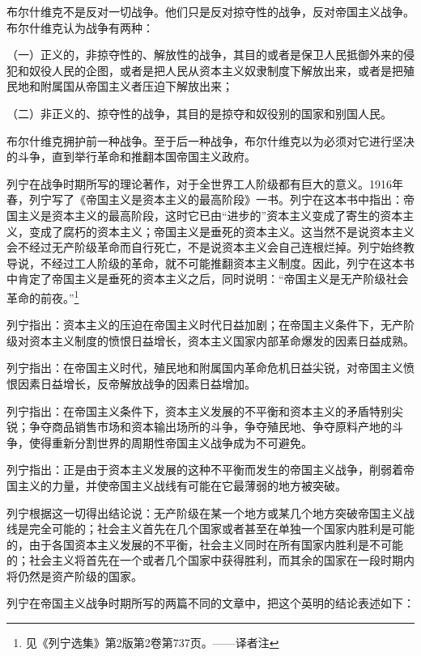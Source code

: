 布尔什维克不是反对一切战争。他们只是反对掠夺性的战争，反对帝国主义战争。布尔什维克认为战争有两种：

（一）正义的，非掠夺性的、解放性的战争，其目的或者是保卫人民抵御外来的侵犯和奴役人民的企图，或者是把人民从资本主义奴隶制度下解放出来，或者是把殖民地和附属国从帝国主义者压迫下解放出来；

（二）非正义的、掠夺性的战争，其目的是掠夺和奴役别的国家和别国人民。

布尔什维克拥护前一种战争。至于后一种战争，布尔什维克以为必须对它进行坚决的斗争，直到举行革命和推翻本国帝国主义政府。

列宁在战争时期所写的理论著作，对于全世界工人阶级都有巨大的意义。1916年春，列宁写了《帝国主义是资本主义的最高阶段》一书。列宁在这本书中指出：帝国主义是资本主义的最高阶段，这时它已由“进步的”资本主义变成了寄生的资本主义，变成了腐朽的资本主义；帝国主义是垂死的资本主义。这当然不是说资本主义会不经过无产阶级革命而自行死亡，不是说资本主义会自己连根烂掉。列宁始终教导说，不经过工人阶级的革命，就不可能推翻资本主义制度。因此，列宁在这本书中肯定了帝国主义是垂死的资本主义之后，同时说明：“帝国主义是无产阶级社会革命的前夜。”\footnote{见《列宁选集》第2版第2卷第737页。——译者注}

列宁指出：资本主义的压迫在帝国主义时代日益加剧；在帝国主义条件下，无产阶级对资本主义制度的愤恨日益增长，资本主义国家内部革命爆发的因素日益成熟。

列宁指出：在帝国主义时代，殖民地和附属国内革命危机日益尖锐，对帝国主义愤恨因素日益增长，反帝解放战争的因素日益增加。

列宁指出：在帝国主义条件下，资本主义发展的不平衡和资本主义的矛盾特别尖锐；争夺商品销售市场和资本输出场所的斗争，争夺殖民地、争夺原料产地的斗争，使得重新分割世界的周期性帝国主义战争成为不可避免。

列宁指出：正是由于资本主义发展的这种不平衡而发生的帝国主义战争，削弱着帝国主义的力量，并使帝国主义战线有可能在它最薄弱的地方被突破。

列宁根据这一切得出结论说：无产阶级在某一个地方或某几个地方突破帝国主义战线是完全可能的；社会主义首先在几个国家或者甚至在单独一个国家内胜利是可能的，由于各国资本主义发展的不平衡，社会主义同时在所有国家内胜利是不可能的；社会主义将首先在一个或者几个国家中获得胜利，而其余的国家在一段时期内将仍然是资产阶级的国家。

列宁在帝国主义战争时期所写的两篇不同的文章中，把这个英明的结论表述如下：

